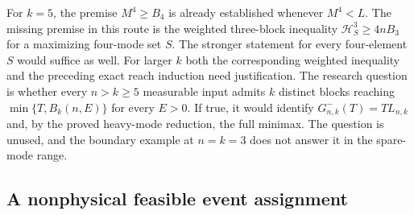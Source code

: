 For $k=5$, the premise $M^4\ge B_4$ is already established whenever
$M^4<L$. The missing premise in this route is the weighted three-block
inequality $\mathcal H_S^3\ge4nB_3$ for a maximizing four-mode set
$S$. The stronger statement for every four-element $S$ would suffice
as well. For larger $k$ both the corresponding weighted inequality and
the preceding exact reach induction need justification.
The research question is whether every $n>k\ge5$ measurable input admits
$k$ distinct blocks reaching $\min\{T,B_k(n,E)\}$ for every $E>0$.
If true, it would identify $G^-_{n,k}(T)=TL_{n,k}$ and, by the proved
heavy-mode reduction, the full minimax. The question is unused, and the
boundary example at $n=k=3$ does not answer it in the spare-mode range.

\subsection{A nonphysical feasible event assignment}\label{subsec:negative-relaxation}

